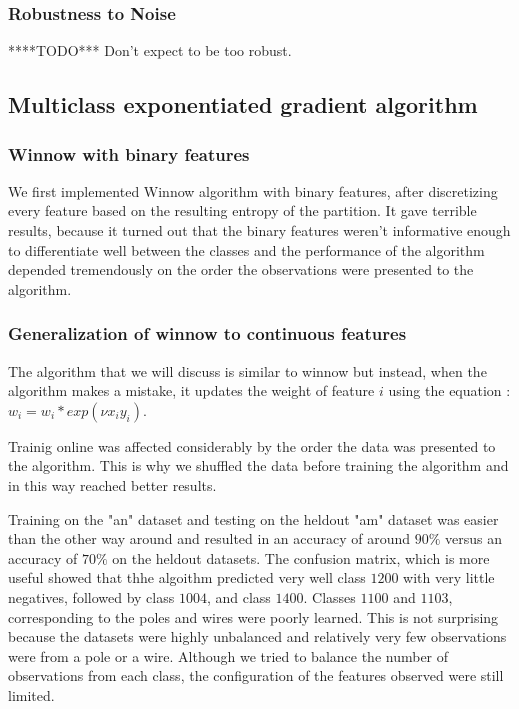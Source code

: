 \documentclass[10pt,a4paper]{article}
\begin{document}
\subsubsection{Robustness to Noise}
****TODO*** Don't expect to be too robust.
\subsection{Multiclass exponentiated gradient algorithm}

\subsubsection{Winnow with binary features}
We first implemented Winnow algorithm with binary features, after discretizing every feature based on the resulting entropy of the partition. It gave terrible results, because it turned out that the binary features weren't informative enough to differentiate well between the classes and the performance of the algorithm depended tremendously on the order the observations were presented to the algorithm. 

\subsubsection{Generalization of winnow to continuous features}

The algorithm that we will discuss is similar to winnow but instead, when the algorithm makes a mistake, it updates the weight of feature $i$ using the equation : $w_i = w_i*exp(\nu x_i y_i)$. 

Trainig online was affected considerably by the order the data was presented to the algorithm. This is why we shuffled the data before training the algorithm and in this way reached better results.

Training on the "an" dataset and testing on the heldout "am" dataset was easier than the other way around and resulted in an accuracy of around $90\%$ versus an accuracy of $70\%$ on the heldout datasets. The confusion matrix, which is more useful showed that thhe algoithm predicted very well class $1200$ with very little negatives, followed by class $1004$, and class $1400$. Classes $1100$ and $1103$, corresponding to the poles and wires were poorly learned. This is not surprising because the datasets were highly unbalanced and relatively very few observations were from a pole or a wire. Although we tried to balance the number of observations from each class, the configuration of the features observed were still limited.
\end{document}
